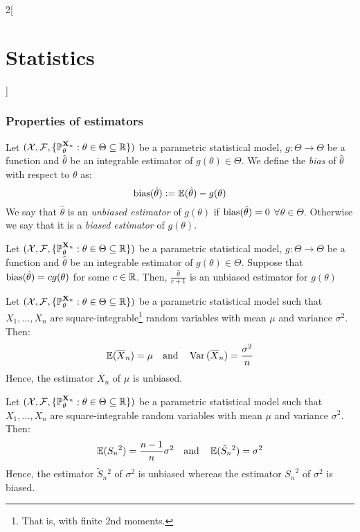 \documentclass[../../../main.tex]{subfiles}
\begin{document}
\begin{multicols}{2}[\section{Statistics}]
  \subsubsection{Properties of estimators}
  \begin{definition}[Bias]
    Let $(\mathcal{X},\mathcal{F},\{\mathbb{P}_{\theta}^{\boldsymbol{\mathrm{X}}_n}:{\theta}\in\Theta\subseteq \mathbb{R}\})$ be a parametric statistical model, $g:\Theta\rightarrow\Theta$ be a function and ${\hat\theta}$ be an integrable estimator of $g({\theta})\in\Theta$. We define the \emph{bias} of ${\hat\theta}$ with respect to ${\theta}$ as: $$\operatorname{bias}({\hat\theta}):=\operatorname{\mathbb{E}}({\hat\theta})-g({\theta})$$ We say that ${\hat\theta}$ is an \emph{unbiased estimator} of $g({\theta})$ if $\operatorname{bias}({\hat\theta})=0$ $\forall\theta\in\Theta$. Otherwise we say that it is a \emph{biased estimator} of $g({\theta})$.
  \end{definition}
  \begin{proposition}
    Let $(\mathcal{X},\mathcal{F},\{\mathbb{P}_{\theta}^{\boldsymbol{\mathrm{X}}_n}:{\theta}\in\Theta\subseteq \mathbb{R}\})$ be a parametric statistical model, $g:\Theta\rightarrow\Theta$ be a function and ${\hat\theta}$ be an integrable estimator of $g({\theta})\in\Theta$. Suppose that $\operatorname{bias}(\hat\theta)=cg(\theta)$ for some $c\in\mathbb{R}$. Then, $\frac{\hat\theta}{c+1}$ is an unbiased estimator for $g(\theta)$
  \end{proposition}
  \begin{proposition}
    Let $(\mathcal{X},\mathcal{F},\{\mathbb{P}_{\theta}^{\boldsymbol{\mathrm{X}}_n}:{\theta}\in\Theta\subseteq \mathbb{R}\})$ be a parametric statistical model such that $X_1,\ldots,X_n$ are square-integrable\footnote{That is, with finite 2nd moments.} \iid random variables with mean $\mu$ and variance $\sigma^2$. Then: $$\operatorname{\mathbb{E}}(\overline{X}_n)=\mu\quad\text{and}\quad\operatorname{Var}{(\overline{X}_n)}=\frac{\sigma^2}{n}$$
    Hence, the estimator $\overline{X}_n$ of $\mu$ is unbiased.
  \end{proposition}
  \begin{proposition}
    Let $(\mathcal{X},\mathcal{F},\{\mathbb{P}_{\theta}^{\boldsymbol{\mathrm{X}}_n}:{\theta}\in\Theta\subseteq \mathbb{R}\})$ be a parametric statistical model such that $X_1,\ldots,X_n$ are square-integrable \iid random variables with mean $\mu$ and variance $\sigma^2$. Then: $$\operatorname{\mathbb{E}}({S_n}^2)=\frac{n-1}{n}\sigma^2\quad\text{and}\quad\operatorname{\mathbb{E}}(\tilde{S}_n{}^2)=\sigma^2$$
    Hence, the estimator $\tilde{S}_n{}^2$ of $\sigma^2$ is unbiased whereas the estimator ${S_n}^2$ of $\sigma^2$ is biased.
  \end{proposition}
  \begin{definition}

\end{definition}
\end{multicols}
\end{document}
